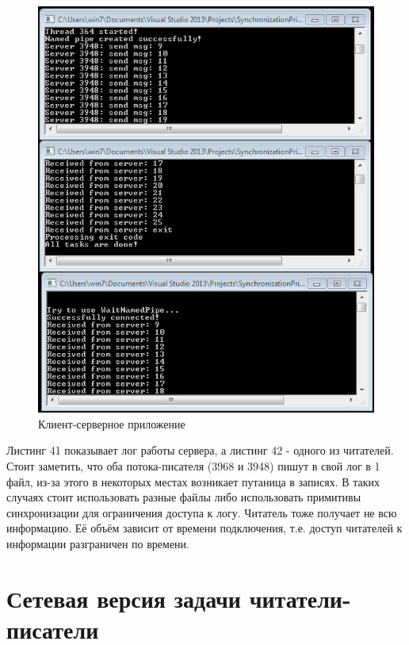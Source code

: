 \documentclass[a4paper, 12pt]{article}		%
\begin{document}
\begin{figure}[h!]
\centering
\includegraphics[scale=0.73]{res/012}
\caption{Клиент-серверное приложение}
\end{figure}

Листинг 41 показывает лог работы сервера, а листинг 42 - одного из читателей. Стоит заметить, что оба потока-писателя (3968 и 3948) пишут в свой лог в 1 файл, из-за этого в некоторых местах возникает путаница в записях. В таких случаях стоит использовать разные файлы либо использовать примитивы синхронизации для ограничения доступа к логу. Читатель тоже получает не всю информацию. Её объём зависит от времени подключения, т.е. доступ читателей к информации разграничен по времени.






\newpage
\section{Сетевая версия задачи читатели-писатели}
\end{document}
